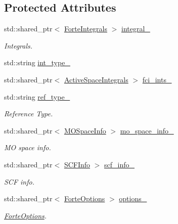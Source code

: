 \subsection*{Protected Attributes}
\begin{DoxyCompactItemize}
\item 
std\+::shared\+\_\+ptr$<$ \mbox{\hyperlink{classforte_1_1_forte_integrals}{Forte\+Integrals}} $>$ \mbox{\hyperlink{classforte_1_1_f_c_i___m_o_a3190b1591d4a53d3a5be57fb4896882f}{integral\+\_\+}}
\begin{DoxyCompactList}\small\item\em Integrals. \end{DoxyCompactList}\item 
std\+::string \mbox{\hyperlink{classforte_1_1_f_c_i___m_o_a594d30b16094805dce911fd098e9620e}{int\+\_\+type\+\_\+}}
\item 
std\+::shared\+\_\+ptr$<$ \mbox{\hyperlink{classforte_1_1_active_space_integrals}{Active\+Space\+Integrals}} $>$ \mbox{\hyperlink{classforte_1_1_f_c_i___m_o_a4a51472873a8d73585eff3d2dcc5b166}{fci\+\_\+ints\+\_\+}}
\item 
std\+::string \mbox{\hyperlink{classforte_1_1_f_c_i___m_o_a23572f3b5e1c9d3603d5107def1c8179}{ref\+\_\+type\+\_\+}}
\begin{DoxyCompactList}\small\item\em Reference Type. \end{DoxyCompactList}\item 
std\+::shared\+\_\+ptr$<$ \mbox{\hyperlink{classforte_1_1_m_o_space_info}{M\+O\+Space\+Info}} $>$ \mbox{\hyperlink{classforte_1_1_f_c_i___m_o_a9631a417ff0c09d0f3214604dce14acc}{mo\+\_\+space\+\_\+info\+\_\+}}
\begin{DoxyCompactList}\small\item\em MO space info. \end{DoxyCompactList}\item 
std\+::shared\+\_\+ptr$<$ \mbox{\hyperlink{classforte_1_1_s_c_f_info}{S\+C\+F\+Info}} $>$ \mbox{\hyperlink{classforte_1_1_f_c_i___m_o_ad66d4aaf42ded7bb18193e20b4edeaee}{scf\+\_\+info\+\_\+}}
\begin{DoxyCompactList}\small\item\em S\+CF info. \end{DoxyCompactList}\item 
std\+::shared\+\_\+ptr$<$ \mbox{\hyperlink{classforte_1_1_forte_options}{Forte\+Options}} $>$ \mbox{\hyperlink{classforte_1_1_f_c_i___m_o_a6d2e236a6c576183daa72f1ccbffaf41}{options\+\_\+}}
\begin{DoxyCompactList}\small\item\em \mbox{\hyperlink{classforte_1_1_forte_options}{Forte\+Options}}. \end{DoxyCompactList}\item 

\end{DoxyCompactItemize}
